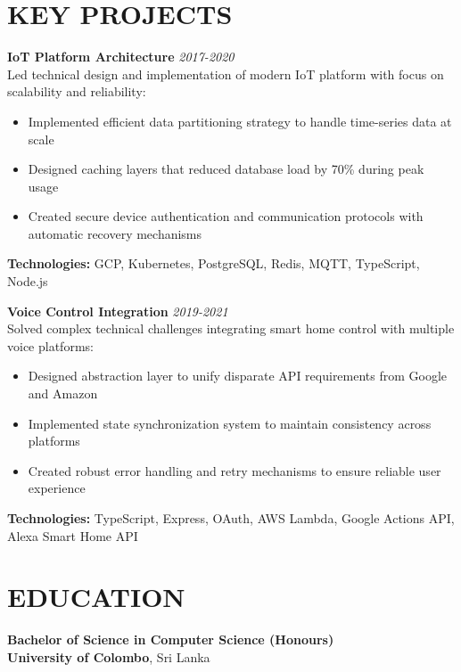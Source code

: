 \documentclass{fullstackdeveloper-ats}
\begin{document}
\section{KEY PROJECTS}

\noindent\textbf{IoT Platform Architecture} \hfill \textit{2017-2020}\\
Led technical design and implementation of modern IoT platform with focus on scalability and reliability:
\begin{itemize}
    \item Implemented efficient data partitioning strategy to handle time-series data at scale
    \item Designed caching layers that reduced database load by 70\% during peak usage
    \item Created secure device authentication and communication protocols with automatic recovery mechanisms
\end{itemize}
\noindent\textbf{Technologies:} GCP, Kubernetes, PostgreSQL, Redis, MQTT, TypeScript, Node.js

\vspace{0.4cm}

\noindent\textbf{Voice Control Integration} \hfill \textit{2019-2021}\\
Solved complex technical challenges integrating smart home control with multiple voice platforms:
\begin{itemize}
    \item Designed abstraction layer to unify disparate API requirements from Google and Amazon
    \item Implemented state synchronization system to maintain consistency across platforms
    \item Created robust error handling and retry mechanisms to ensure reliable user experience
\end{itemize}
\noindent\textbf{Technologies:} TypeScript, Express, OAuth, AWS Lambda, Google Actions API, Alexa Smart Home API

\section{EDUCATION}

\noindent\textbf{Bachelor of Science in Computer Science (Honours)} \hfill {}\\
\textbf{University of Colombo}, Sri Lanka
\end{document}
